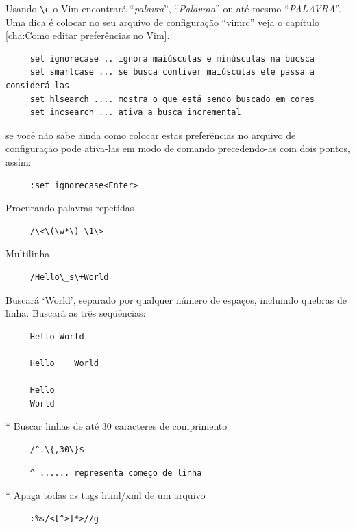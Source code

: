 \documentclass[10pt,a4paper,openany]{book}
\begin{document}
Usando \verb|\c| o Vim encontrará ``{\em{palavra}}'', ``{\em{Palavraa}}'' ou
até mesmo ``{\em{PALAVRA}}''. Uma dica é colocar no seu arquivo de
configuração ``vimrc'' veja o capítulo \ref{cha:Como editar preferências no Vim}.

\begin{verbatim}
     set ignorecase .. ignora maiúsculas e minúsculas na bucsca
     set smartcase ... se busca contiver maiúsculas ele passa a considerá-las
     set hlsearch .... mostra o que está sendo buscado em cores
     set incsearch ... ativa a busca incremental
\end{verbatim}

se você não sabe ainda como colocar estas preferências no arquivo de configuração pode
ativa-las em modo de comando precedendo-as com dois pontos, assim:

\begin{verbatim}
     :set ignorecase<Enter>
\end{verbatim}

Procurando palavras repetidas

\begin{verbatim}
     /\<\(\w*\) \1\>
\end{verbatim}

Multilinha

\begin{verbatim}
     /Hello\_s\+World
\end{verbatim}

Buscará `World', separado por qualquer número de espaços,
incluindo quebras de linha. Buscará as três seqüências:

\begin{verbatim}
     Hello World
     
     Hello    World
     
     Hello
     World
\end{verbatim}

* Buscar linhas de até 30 caracteres de comprimento

\begin{verbatim}
     /^.\{,30\}$
\end{verbatim}

\begin{verbatim}
     ^ ...... representa começo de linha
\end{verbatim}

* Apaga todas as tags html/xml de um arquivo

\begin{verbatim}
     :%s/<[^>]*>//g
\end{verbatim}
\end{document}
